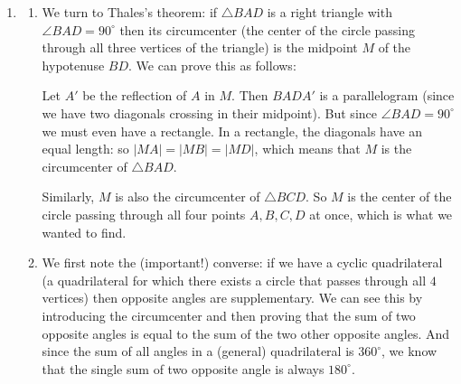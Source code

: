 \documentclass[11pt]{scrartcl}
\begin{document}
\begin{enumerate}[label=\textbf{G\arabic*}.]
    \item \begin{enumerate}[label=(\alph*)]
        \item %

We turn to Thales's theorem: if $\triangle BAD$ is a right triangle with $\angle BAD = 90^\circ$ then its  circumcenter (the center of the circle passing through all three vertices of the triangle) is the midpoint $M$ of the hypotenuse $BD$. We can prove this as follows:
        
        \begin{center}
\end{center}
        
        Let $A'$ be the reflection of $A$ in $M$. Then $BADA'$ is a parallelogram (since we have two diagonals crossing in their midpoint). But since $\angle BAD = 90^\circ$ we must even have a rectangle. In a rectangle, the diagonals have an equal length: so $|MA| = |MB| = |MD|$, which means that $M$ is the circumcenter of $\triangle BAD$.
        
        Similarly, $M$ is also the circumcenter of $\triangle BCD$. So $M$ is the center of the circle passing through all four points $A, B, C, D$ at once, which is what we wanted to find.
        
        \item %
        We first note the (important!) converse: if we have a cyclic quadrilateral (a quadrilateral for which there exists a circle that passes through all $4$ vertices) then opposite angles are supplementary. We can see this by introducing the circumcenter and then proving that the sum of two opposite angles is equal to the sum of the two other opposite angles. And since the sum of all angles in a (general) quadrilateral is $360^\circ$, we know that the single sum of two opposite angle is always $180^\circ$.
        

\end{enumerate}
\end{enumerate}
\end{document}
